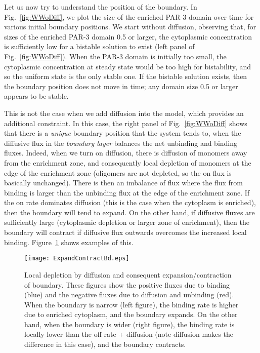\documentclass[11pt]{article}
\newcommand{\6}[1]{#1_{\text{6}}}
\newcommand{\3}[1]{#1_{\text{3}}}
\begin{document}
Let us now try to understand the position of the boundary. In Fig.\ \ref{fig:WWoDiff}, we plot the size of the enriched PAR-3 domain over time for various initial boundary positions. We start without diffusion, observing that, for sizes of the enriched PAR-3 domain 0.5 or larger, the cytoplasmic concentration is sufficiently low for a bistable solution to exist (left panel of Fig.\ \ref{fig:WWoDiff}). When the PAR-3 domain is initially too small, the cytoplasmic concentration at steady state would be too high for bistability, and so the uniform state is the only stable one. If the bistable solution exists, then the boundary position does not move in time; any domain size 0.5 or larger appears to be stable.

This is not the case when we add diffusion into the model, which provides an additional constraint. In this case, the right panel of Fig.\ \ref{fig:WWoDiff} shows that there is a \emph{unique} boundary position that the system tends to, when the diffusive flux in the \emph{boundary layer} balances the net unbinding and binding fluxes. Indeed, when we turn on diffusion, there is diffusion of monomers away from the enrichment zone, and consequently local depletion of monomers at the edge of the enrichment zone (oligomers are not depleted, so the on flux is basically unchanged). There is then an imbalance of flux where the flux from binding is larger than the unbinding flux at the edge of the enrichment zone. If the on rate dominates diffusion (this is the case when the cytoplasm is enriched), then the boundary will tend to expand. On the other hand, if diffusive fluxes are sufficiently large (cytoplasmic depletion or larger zone of enrichment), then the boundary will contract if diffusive flux outwards overcomes the increased local binding. Figure\ \ref{fig:ExpContrBd} shows examples of this.

\begin{figure}
\centering
\texttt{[image: ExpandContractBd.eps]}
\caption{\label{fig:ExpContrBd}Local depletion by diffusion and consequent expansion/contraction of boundary. These figures show the positive fluxes due to binding (blue) and the negative fluxes due to diffusion and unbinding (red). When the boundary is narrow (left figure), the binding rate is higher due to enriched cytoplasm, and the boundary expands. On the other hand, when the boundary is wider (right figure), the binding rate is locally lower than the off rate + diffusion (note diffusion makes the difference in this case), and the boundary contracts. }
\end{figure}
\end{document}
